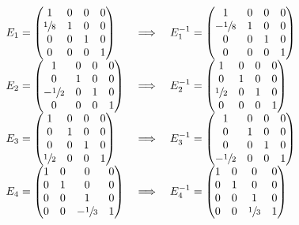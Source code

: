 \documentclass[12pt]{article}
\begin{document}
$$
\begin{array}{lcl}
    E_1 = \begin{pmatrix*}[c]
        1 & 0 & 0 & 0 \\
        \sfrac{1}{8} & 1 & 0 & 0 \\
        0 & 0 & 1 & 0 \\
        0 & 0 & 0 & 1
    \end{pmatrix*}
    &\implies&
    E_1^{-1} = \begin{pmatrix*}[c]
        1 & 0 & 0 & 0 \\
        -\sfrac{1}{8} & 1 & 0 & 0 \\
        0 & 0 & 1 & 0 \\
        0 & 0 & 0 & 1
    \end{pmatrix*} \\
    E_2 = \begin{pmatrix*}[c]
        1 & 0 & 0 & 0 \\
        0 & 1 & 0 & 0 \\
        -\sfrac{1}{2} & 0 & 1 & 0 \\
        0 & 0 & 0 & 1
    \end{pmatrix*}
    &\implies&
    E_2^{-1} = \begin{pmatrix*}[c]
        1 & 0 & 0 & 0 \\
        0 & 1 & 0 & 0 \\
        \sfrac{1}{2} & 0 & 1 & 0 \\
        0 & 0 & 0 & 1
    \end{pmatrix*} \\
    E_3 = \begin{pmatrix*}[c]
        1 & 0 & 0 & 0 \\
        0 & 1 & 0 & 0 \\
        0 & 0 & 1 & 0 \\
        \sfrac{1}{2} & 0 & 0 & 1
    \end{pmatrix*}
    &\implies&
    E_3^{-1} = \begin{pmatrix*}[c]
        1 & 0 & 0 & 0 \\
        0 & 1 & 0 & 0 \\
        0 & 0 & 1 & 0 \\
        -\sfrac{1}{2} & 0 & 0 & 1
    \end{pmatrix*} \\
    E_4 = \begin{pmatrix*}[c]
        1 & 0 & 0 & 0 \\
        0 & 1 & 0 & 0 \\
        0 & 0 & 1 & 0 \\
        0 & 0 & -\sfrac{1}{3} & 1
    \end{pmatrix*}
    &\implies&
    E_4^{-1} = \begin{pmatrix*}[c]
        1 & 0 & 0 & 0 \\
        0 & 1 & 0 & 0 \\
        0 & 0 & 1 & 0 \\
        0 & 0 & \sfrac{1}{3} & 1
    \end{pmatrix*}
\end{array}
$$
\end{document}
